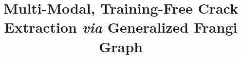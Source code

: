 \documentclass[conference]{IEEEtran}
\newcommand{\nom}[1]{\textsc{#1}}
\begin{document}
%
\title{Multi-Modal, Training-Free Crack Extraction \emph{via} Generalized Frangi Graph}


\end{document}
